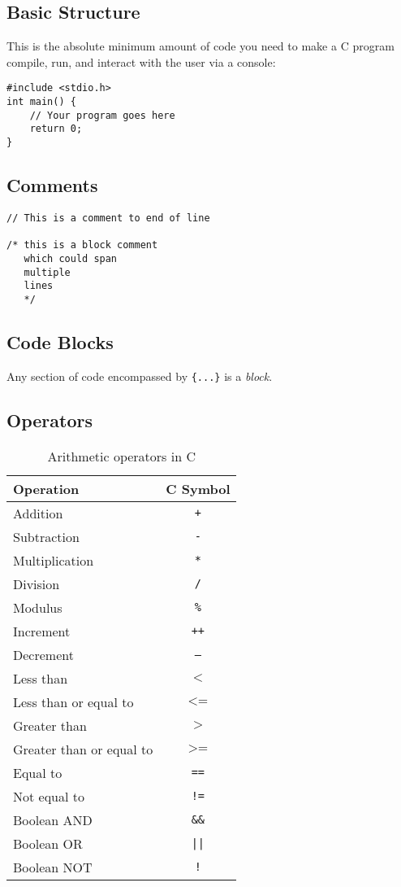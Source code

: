\documentclass{lab}
\begin{document}
\begin{multicols}{2}
\subsection{Basic Structure}
This is the absolute minimum amount of code you need to make a C program compile, run, and interact with the user via a console:
\begin{lstlisting}[style=CStyle]
#include <stdio.h>
int main() {
	// Your program goes here
	return 0;
}
\end{lstlisting}
\subsection{Comments}
\begin{lstlisting}[style=CStyle]
// This is a comment to end of line

/* this is a block comment
   which could span
   multiple
   lines
   */
\end{lstlisting}

\subsection{Code Blocks}

Any section of code encompassed by \texttt{\{...\}} is a \textit{block}.

\subsection{Operators}

\begin{table}[H]
\centering
\begin{tabular}{|l|c|}
\hline
Operation      & C Symbol \\
\hline
Addition       & \texttt{+}        \\
Subtraction    & \texttt{-}        \\
Multiplication & \texttt{*}        \\
Division       & \texttt{/}       \\
Modulus		   & \texttt{\%}	\\
Increment	& \texttt{++}	\\
Decrement	& \texttt{--} \\
Less than       & $\texttt{<}$        \\
Less than or equal to    & $\texttt{<=}$\\
Greater than & $\texttt{>}$        \\
Greater than or equal to       & $\texttt{>=}$ \\
Equal to & \texttt{==} \\
Not equal to & \texttt{!=} \\
Boolean AND & \texttt{\&\&} \\
Boolean OR & \texttt{||} \\
Boolean NOT & \texttt{!} \\
\hline
\end{tabular}
\caption{Arithmetic operators in C}
\end{table}


\end{multicols}
\end{document}

